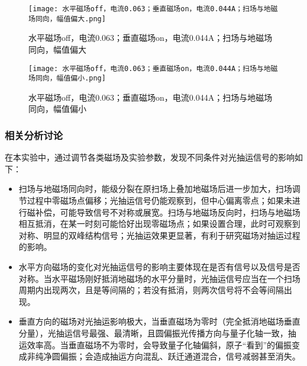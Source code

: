 \begin{figure}[H]
    \centering
    \begin{minipage}{0.45\textwidth}
        \texttt{[image: 水平磁场off，电流0.063；垂直磁场on，电流0.044A；扫场与地磁场同向，幅值偏大.png]}
        \caption{水平磁场off，电流0.063；垂直磁场on，电流0.044A；扫场与地磁场同向，幅值偏大}
        \label{fig:img11}
    \end{minipage}%
         \hfill
    \begin{minipage}{0.45\textwidth}
        \texttt{[image: 水平磁场off，电流0.063；垂直磁场on，电流0.044A；扫场与地磁场同向，幅值偏小.png]}
        \caption{水平磁场off，电流0.063；垂直磁场on，电流0.044A；扫场与地磁场同向，幅值偏小}
        \label{fig:img12}
    \end{minipage}
\end{figure}



\subsubsection{相关分析讨论}

    在本实验中，通过调节各类磁场及实验参数，发现不同条件对光抽运信号的影响如下：
    \begin{itemize}
        \item 扫场与地磁场同向时，能级分裂在原扫场上叠加地磁场后进一步加大，扫场调节过程中零磁场点偏移；光抽运信号仍能观察到，但中心偏离零点；如果未进行磁补偿，可能导致信号不对称或展宽。扫场与地磁场反向时，扫场与地磁场相互抵消，在某一时刻可能恰好出现零磁场点；如果设置合理，此时可观察到对称、明显的双峰结构信号；光抽运效果更显著，有利于研究磁场对抽运过程的影响。

        \item 水平方向磁场的变化对光抽运信号的影响主要体现在是否有信号以及信号是否对称。当水平磁场刚好抵消地磁场的水平分量时，光抽运信号应当在一个扫场周期内出现两次，且是等间隔的；若没有抵消，则两次信号将不会等间隔出现。

        \item 垂直方向的磁场对光抽运影响极大，当垂直磁场为零时（完全抵消地磁场垂直分量），光抽运信号最强、最清晰，且圆偏振光传播方向与量子化轴一致，抽运效率高。当垂直磁场不为零时，会导致量子化轴偏斜，原子“看到”的偏振变成非纯净圆偏振；会造成抽运方向混乱、跃迁通道混合，信号减弱甚至消失。

    \end{itemize}
    
    
    
